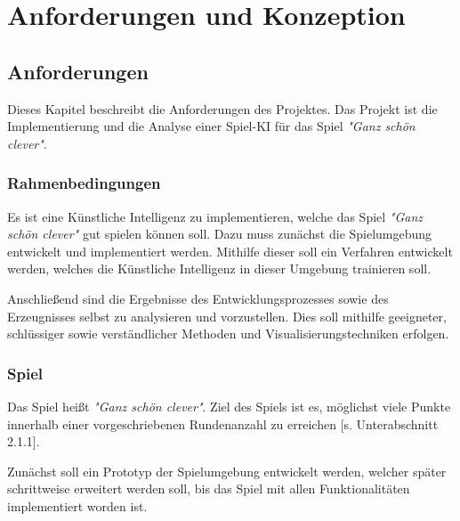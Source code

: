 \section{Anforderungen und Konzeption}
\subsection{Anforderungen}
Dieses Kapitel beschreibt die Anforderungen des Projektes. Das Projekt ist die Implementierung und die Analyse einer Spiel-KI für das Spiel \textit{"Ganz schön clever"}.
\subsubsection{Rahmenbedingungen}
Es ist eine Künstliche Intelligenz zu implementieren, welche das Spiel \textit{"Ganz schön clever"} gut spielen können soll. Dazu muss zunächst die Spielumgebung entwickelt und implementiert werden. Mithilfe dieser soll ein Verfahren entwickelt werden, welches die Künstliche Intelligenz in dieser Umgebung trainieren soll.

Anschließend sind die Ergebnisse des Entwicklungsprozesses sowie des Erzeugnisses selbst zu analysieren und vorzustellen. Dies soll mithilfe geeigneter, schlüssiger sowie verständlicher Methoden und Visualisierungstechniken erfolgen.
\subsubsection{Spiel}
Das Spiel heißt \textit{"Ganz schön clever"}. Ziel des Spiels ist es, möglichst viele Punkte innerhalb einer vorgeschriebenen Rundenanzahl zu erreichen [s. Unterabschnitt 2.1.1].

Zunächst soll ein Prototyp der Spielumgebung entwickelt werden, welcher später schrittweise erweitert werden soll, bis das Spiel mit allen Funktionalitäten implementiert worden ist.\\

